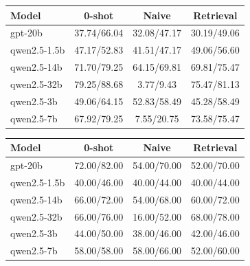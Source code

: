 \begin{tabular}{|l|c|c|c|}
\hline
Model & 0-shot & Naive & Retrieval \\
\hline
gpt-20b & 37.74/66.04 & 32.08/47.17 & 30.19/49.06 \\
qwen2.5-1.5b & 47.17/52.83 & 41.51/47.17 & 49.06/56.60 \\
qwen2.5-14b & 71.70/79.25 & 64.15/69.81 & 69.81/75.47 \\
qwen2.5-32b & 79.25/88.68 & 3.77/9.43 & 75.47/81.13 \\
qwen2.5-3b & 49.06/64.15 & 52.83/58.49 & 45.28/58.49 \\
qwen2.5-7b & 67.92/79.25 & 7.55/20.75 & 73.58/75.47 \\
\hline
\end{tabular}

\begin{tabular}{|l|c|c|c|}
\hline
Model & 0-shot & Naive & Retrieval \\
\hline
gpt-20b & 72.00/82.00 & 54.00/70.00 & 52.00/70.00 \\
qwen2.5-1.5b & 40.00/46.00 & 40.00/44.00 & 40.00/44.00 \\
qwen2.5-14b & 66.00/72.00 & 54.00/68.00 & 60.00/72.00 \\
qwen2.5-32b & 66.00/76.00 & 16.00/52.00 & 68.00/78.00 \\
qwen2.5-3b & 44.00/50.00 & 38.00/46.00 & 42.00/46.00 \\
qwen2.5-7b & 58.00/58.00 & 58.00/66.00 & 52.00/60.00 \\
\hline
\end{tabular}

